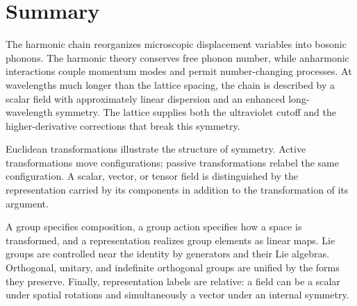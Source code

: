 \documentclass[11pt]{article}
\begin{document}
\section*{Summary}

The harmonic chain reorganizes microscopic displacement variables into
bosonic phonons.  The harmonic theory conserves free phonon number, while
anharmonic interactions couple momentum modes and permit number-changing
processes.  At wavelengths much longer than the lattice spacing, the chain is
described by a scalar field with approximately linear dispersion and an
enhanced long-wavelength symmetry.  The lattice supplies both the ultraviolet
cutoff and the higher-derivative corrections that break this symmetry.

Euclidean transformations illustrate the structure of symmetry.  Active
transformations move configurations; passive transformations relabel the same
configuration.  A scalar, vector, or tensor field is distinguished by the
representation carried by its components in addition to the transformation
of its argument.

A group specifies composition, a group action specifies how a space is
transformed, and a representation realizes group elements as linear maps.
Lie groups are controlled near the identity by generators and their Lie
algebras.  Orthogonal, unitary, and indefinite orthogonal groups are unified
by the forms they preserve.  Finally, representation labels are relative: a
field can be a scalar under spatial rotations and simultaneously a vector
under an internal symmetry.
\end{document}
